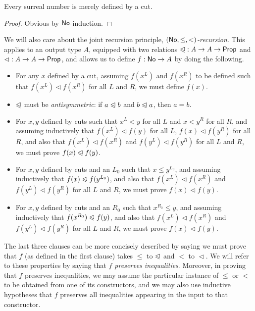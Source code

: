 \begin{lem}
  Every surreal number is merely defined by a cut.
\end{lem}
\begin{proof}
  Obvious by $\mathsf{No}$-induction.
\end{proof}


\newcommand{\ble}{\trianglelefteqslant}
\newcommand{\blt}{\vartriangleleft}
\newcommand{\bble}{\sqsubseteq}
\newcommand{\bblt}{\sqsubset}

We will also care about the joint recursion principle, \emph{$(\mathsf{No},\le,<)$-recursion}.
This applies to an output type $A$, equipped with two relations $\mathord\ble:A\to A\to\prop$ and $\mathord\blt:A\to A\to\prop$, and allows us to define $f:\mathsf{No}\to A$ by doing the following.
\begin{itemize}
\item For any $x$ defined by a cut, assuming $f(x^L)$ and $f(x^R)$ to be defined such that $f(x^L)\blt f(x^R)$ for all $L$ and $R$, we must define $f(x)$.
\item $\ble$ must be \emph{antisymmetric}: if $a\ble b$ and $b\ble a$, then $a=b$.
\item For $x,y$ defined by cuts such that $x^L<y$ for all $L$ and $x<y^R$ for all $R$, and assuming inductively that $f(x^L)\blt f(y)$ for all $L$, $f(x)\blt f(y^R)$ for all $R$, and also that $f(x^L)\blt f(x^R)$ and $f(y^L)\blt f(y^R)$ for all $L$ and $R$, we must prove $f(x)\ble f(y)$.
\item For $x,y$ defined by cuts and an $L_0$ such that $x\le y^{L_0}$, and assuming inductively that $f(x)\ble f(y^{L_0})$, and also that $f(x^L)\blt f(x^R)$ and $f(y^L)\blt f(y^R)$ for all $L$ and $R$, we must prove $f(x)\blt f(y)$.
\item For $x,y$ defined by cuts and an $R_0$ such that $x^{R_0}\le y$, and assuming inductively that $f(x^{R_0})\ble f(y)$, and also that $f(x^L)\blt f(x^R)$ and $f(y^L)\blt f(y^R)$ for all $L$ and $R$, we must prove $f(x)\blt f(y)$.
\end{itemize}
The last three clauses can be more concisely described by saying we must prove that $f$ (as defined in the first clause) takes $\le$ to $\ble$ and $<$ to $\blt$.
We will refer to these properties by saying that \emph{$f$ preserves inequalities}.
Moreover, in proving that $f$ preserves inequalities, we may assume the particular instance of $\le$ or $<$ to be obtained from one of its constructors, and we may also use inductive hypotheses that $f$ preserves all inequalities appearing in the input to that constructor.

